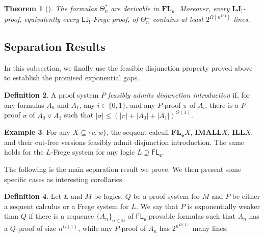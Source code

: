 \documentclass[12pt,a4paper]{article}
\theoremstyle{plain}
\newtheorem{theorem}{Theorem}
\theoremstyle{definition}
\newtheorem{definition}[theorem]{Definition}
\newtheorem{example}[theorem]{Example}
\newcommand{\BFL}{\mathbf{FL_e}}
\newcommand{\LJajab}{\mathbf{LJ_!}}
\begin{document}
\begin{theorem}[{\cite[Corollary 5.4]{Raheleh}}]
\label{Thm: exp lower bound FLe}
The formulas $\Theta^*_n$ are derivable in $\BFL$. Moreover, every $\LJajab$-proof, equivalently every $\mathsf{LJ_!}$-Frege proof, of $\Theta^{\bot}_n$ contains at least $2^{\Omega(n^{1/4})}$ lines.
\end{theorem}

\subsection{Separation Results}

In this subsection, we finally use the feasible disjunction property proved above to establish the promised exponential gaps.

\begin{definition}
A proof system $P$ \emph{feasibly admits disjunction introduction} if, for any formulas $A_0$ and $A_1$, any $i \in \{0,1\}$, and any $P$-proof $\pi$ of $A_i$, there is a $P$-proof $\sigma$ of $A_0 \vee A_1$ such that $|\sigma| \leq (|\pi|+|A_0|+|A_1|)^{O(1)}$.
\end{definition}

\begin{example}
For any $X \subseteq \{c,w\}$, the sequent calculi $\mathbf{FL_e}X$, $\mathbf{IMALL}X$, $\mathbf{ILL}X$, and their cut-free versions feasibly admit disjunction introduction. The same holds for the $L$-Frege system for any logic $L \supseteq \mathsf{FL_e}$.
\end{example}

The following is the main separation result we prove. We then present some specific cases as interesting corollaries.

\begin{definition}
Let $L$ and $M$ be logics, $Q$ be a proof system for $M$ and $P$ be either a sequent calculus or a Frege system for $L$. We say that $P$ is exponentially weaker than $Q$ if there is a sequence $\{A_n\}_{n \in \mathbb{N}}$ of $\mathsf{FL_e}$-provable formulas such that $A_n$ has a $Q$-proof of size $n^{O(1)}$, while any $P$-proof of $A_n$ has $2^{n^{\Omega(1)}}$ many lines.
\end{definition}
\end{document}
